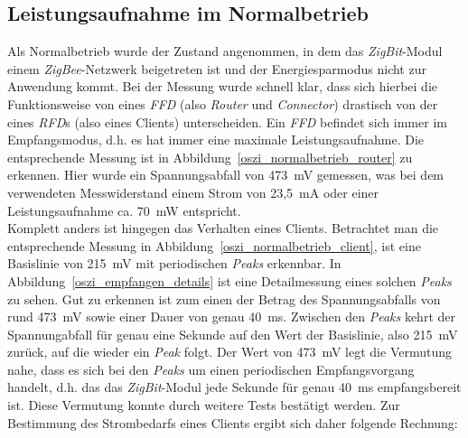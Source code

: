 \subsection{Leistungsaufnahme im Normalbetrieb}\label{leistungsaufnahme_normalbetrieb}
\label{ergebnis_normal}
\Abbildungps{!htb}{0.75}{oszi/normalbetrieb_router.jpg}{oszi_normalbetrieb_router}{Router oder Koordinator im Normalbetrieb. 
}   
\Abbildungps{!htb}{0.75}{oszi/normalbetrieb_client.jpg}{oszi_normalbetrieb_client}{Endknoten im Normalbetrieb ohne Energiesparmodus. 
}

Als Normalbetrieb wurde der Zustand angenommen, in dem das \emph{ZigBit}-Modul einem \emph{ZigBee}-Netzwerk beigetreten
ist und der Energiesparmodus nicht zur Anwendung kommt. Bei der Messung wurde schnell klar, dass sich hierbei die
Funktionsweise von eines \emph{FFD} (also \emph{Router} und \emph{Connector}) drastisch von der eines \emph{RFD}s (also 
eines Clients) 
unterscheiden. Ein \emph{FFD} befindet sich immer im Empfangsmodus, d.h. es hat immer eine maximale Leistungsaufnahme. 
Die entsprechende Messung ist in Abbildung~\ref{oszi_normalbetrieb_router} zu erkennen. Hier wurde ein Spannungsabfall
von 473~mV gemessen, was bei dem verwendeten Messwiderstand einem Strom von 23,5~mA oder einer Leistungsaufnahme ca. 70~mW entspricht.\\
Komplett anders ist hingegen das Verhalten eines Clients. Betrachtet man die entsprechende Messung in
Abbildung~\ref{oszi_normalbetrieb_client}, ist eine Basislinie von 215~mV mit periodischen \emph{Peaks} erkennbar. 
In Abbildung~\ref{oszi_empfangen_details} ist eine Detailmessung eines solchen \emph{Peaks} zu sehen.  Gut zu erkennen ist zum 
einen der Betrag des Spannungsabfalls von rund 473~mV sowie einer Dauer von genau 40~ms. Zwischen den \emph{Peaks} kehrt der 
Spannungabfall für genau eine Sekunde auf den Wert der Basislinie, also 215~mV zurück, auf die wieder ein \emph{Peak} folgt.
Der Wert von 473~mV legt die Vermutung nahe, dass es sich bei den \emph{Peaks} um einen periodischen Empfangsvorgang handelt,
d.h. das das \emph{ZigBit}-Modul jede Sekunde für genau 40~ms empfangsbereit ist. Diese Vermutung konnte durch weitere
Tests bestätigt werden. Zur Bestimmung des Strombedarfs eines Clients ergibt sich daher folgende Rechnung:

